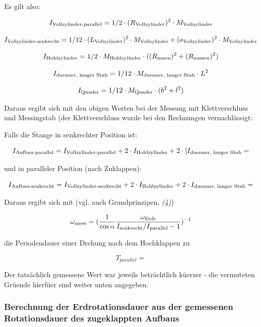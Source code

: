 \documentclass[11pt]{scrartcl}
\newcommand{\ltext}[1]{\ensuremath{_{\textnormal{#1}}}}
\begin{document}
Es gilt also:

\[
I_{\textnormal{Vollzylinder-parallel}}=1/2 \cdot (R_{\textnormal{Vollzylinder}})^2 \cdot M_{\textnormal{Vollzylinder}}\]



\[I_{\textnormal{Vollzylinder-senkrecht}}=1/12 \cdot (L_{\textnormal{Vollzylinder}})^2 \cdot M_{\textnormal{Vollzylinder}} +(a_{\textnormal{Vollzylinder}})^2 \cdot M_{\textnormal{Vollzylinder}}\]


\[I_{\textnormal{Hohlzylinder}}=1/2 \cdot M_{\textnormal{Hohlzylinder}} \cdot ((R_{\textnormal{innen}})^2+(R_{\textnormal{aussen}})^2)\]


\[I_{\textnormal{duenner, langer Stab}}=1/12 \cdot M_{\textnormal{duenner, langer Stab}} \cdot L^2\]



\[I_{\textnormal{Quader}}=1/12 \cdot M_{\textnormal{Quader}} \cdot (b^2+l^2)\]

Daraus ergibt sich mit den obigen Werten bei der Messung mit Klettverschluss und Messingstab (der Klettverschluss wurde bei den Rechnungen vernachl\"assigt:


Falls die Stange in senkrechter Position ist:

\[I_{\textnormal{Aufbau-parallel}}=I_{\textnormal{Vollzylinder-parallel}}+2 \cdot I_{\textnormal{Hohlzylinder}} + 2 \cdot [I_{\textnormal{duenner, langer Stab}}= \]


und in paralleler Position (nach Zuklappen):

\[I_{\textnormal{Aufbau-senkrecht}}=I_{\textnormal{Vollzylinder-senkrecht}}+2 \cdot I_{\textnormal{Hohlzylinder}} + 2 \cdot I_{\textnormal{duenner, langer Stab}}=\]

Daraus ergibt sich mit (vgl. auch Grundprinzipen, \textit{(4)})

\[\omega\ltext{mess} = 
(\frac{1}{\cos\alpha}
\frac{\omega\ltext{Erde}}{I\ltext{senkrecht} / I\ltext{parallel} - 1})^{-1}\]

die Periodendauer einer Drehung nach dem Hochklappen zu

\[T_{parallel}=\]

Der tats\"achlich gemessene Wert war jeweils betr\"achtlich k\"uerzer - die vermuteten Gr\"uende hierf\"uer sind weiter unten angegeben.

\subsubsection{Berechnung der Erdrotationsdauer aus der gemessenen Rotationsdauer des zugeklappten Aufbaus}
\end{document}
